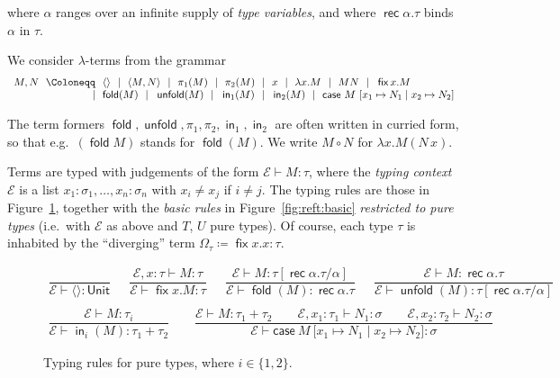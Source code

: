 \documentclass[%
  a4paper,
  UKenglish,
  cleveref,
  autoref,
  thm-restate,
  numberwithinsect,
]{lipics-v2021}
\newcommand\deq\coloneqq
\newcommand\bnf\Coloneqq
\newcommand\gs{~~|~~}
\newcommand\thesis{\vdash}
\newcommand\pair[1]{{\langle #1\rangle}}
\newcommand\copair[1]{{\lbrack #1 \rbrack}}
\newcommand\comp{\mathbin\circ}
\newcommand\Env{\mathcal{E}}    %
\newcommand\term[1]{\mathsf{#1}}
\newcommand\type[1]{\term{#1}}
\newcommand\cse{\term{case}}
\newcommand\inj{\mathop{\term{in}}}
\newcommand\fix{\mathop{\term{fix}}}
\newcommand\fold{\mathop{\term{fold}}}
\newcommand\unfold{\mathop{\term{unfold}}}
\newcommand\Unit{\type{Unit}}
\newcommand\rec{\mathop{\type{rec}}}	%
\newcommand\TV{\alpha}		%
\newcommand\PT{\tau}		%
\newcommand\PTbis{\sigma}	%
\newcommand\RT{T}               %
\newcommand\RTbis{U}            %
\begin{document}
\noindent
where $\TV$ ranges over an infinite supply of \emph{type variables},
and where $\rec\TV.\PT$ binds $\TV$ in $\PT$.
 
We consider $\lambda$-terms from the grammar
\[
\begin{array}{r @{~~} r @{~~} l}
    M,N 
&   \bnf
&   \pair{}
\gs \pair{M,N}
\gs \pi_1(M)
\gs \pi_2(M)
\gs x
\gs \lambda x.M
\gs M N
\gs \fix x.M
\\
%
&   \mid
&   \fold(M)
\gs \unfold(M)
\gs \inj_1(M)
\gs \inj_2(M)
\gs \cse\ M\ \copair{x_1 \mapsto N_1 \mid x_2 \mapsto N_2}
\end{array}
\]

\noindent
The term formers $\fold, \unfold, \pi_1, \pi_2, \inj_1, \inj_2$
are often written in curried form,
so that e.g.\ $(\fold M)$ stands for $\fold(M)$.
We write $M \comp N$ for $\lambda x. M(N\, x)$.


Terms are typed with judgements of the form
$\Env \thesis M \colon \PT$, where the \emph{typing context} $\Env$ is a list
$x_1\colon \PTbis_1, \dots, x_n\colon \PTbis_n$ with $x_i \neq x_j$
if $i \neq j$.
The typing rules are those in Figure~\ref{fig:pure},
together with the \emph{basic rules} in Figure~\ref{fig:reft:basic}
\emph{restricted to pure types}
(i.e.\ with $\Env$ as above and $\RT$, $\RTbis$ pure types).
Of course, each type $\PT$ is inhabited
by the ``diverging'' term $\Omega_\PT \deq \fix x.x \colon \PT$.


\begin{figure}[t!]
\centering
\(
\begin{array}{c}
%
\dfrac{}
  {\Env \thesis \pair{} \colon \Unit}
%
\quad~~
%
\dfrac{\Env,x\colon \PT \thesis M \colon \PT}
  {\Env \thesis \fix x.M \colon \PT}
%
\quad~~
%
\dfrac{\Env \thesis M \colon \PT[\rec\TV.\PT/\TV]}
  {\Env \thesis \fold(M) \colon \rec\TV.\PT}
%
\quad~~
%
\dfrac{\Env \thesis M \colon \rec\TV.\PT}
  {\Env \thesis \unfold(M) \colon \PT[\rec\TV.\PT/\TV]}
%
\\\\
%
\dfrac{\Env \thesis M \colon \PT_i}
  {\Env \thesis \inj_i(M) \colon \PT_1 + \PT_2}
%
\qquad
%
\dfrac{\Env \thesis M \colon \PT_1 + \PT_2
  \qquad \Env, x_1 \colon \PT_1 \thesis N_1 \colon \PTbis
  \qquad \Env, x_2 \colon \PT_2 \thesis N_2 \colon \PTbis}
  {\Env \thesis \cse\ M\ \copair{x_1 \mapsto N_1 \mid x_2 \mapsto N_2} \colon \PTbis}
%
\end{array}
\)
\caption{Typing rules for pure types, where $i \in \{1,2\}$.%
\label{fig:pure}}
\end{figure}
\end{document}
